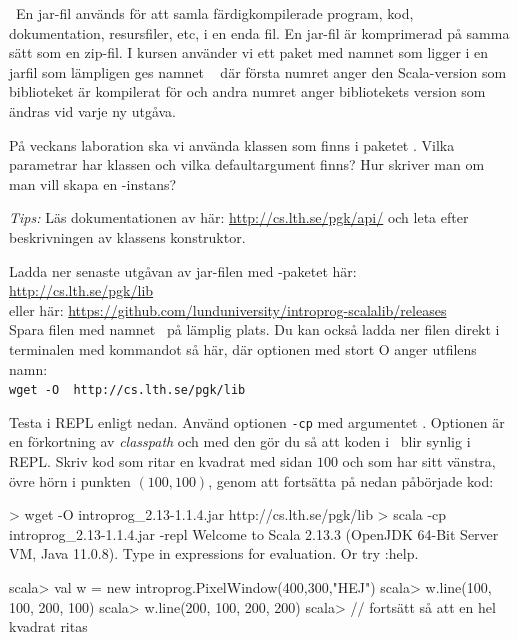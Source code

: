 \QUESTEND




\QUESTBEGIN

\Task \what~En jar-fil används för att samla färdigkompilerade program, kod, dokumentation, resursfiler, etc, i en enda fil. En jar-fil är komprimerad på samma sätt som en zip-fil. I kursen använder vi ett paket med namnet  som ligger i en jarfil som lämpligen ges namnet \LibJar~ där första numret anger den Scala-version som biblioteket är kompilerat för och andra numret anger bibliotekets version som ändras vid varje ny utgåva.

\Subtask På veckans laboration ska vi använda klassen  som finns i paketet . Vilka parametrar har klassen  och vilka defaultargument finns? Hur skriver man om man vill skapa en -instans?

\emph{Tips:}  Läs dokumentationen av  här: \url{http://cs.lth.se/pgk/api/}
och leta efter beskrivningen av klassens konstruktor.

\Subtask Ladda ner senaste utgåvan av jar-filen med -paketet här:
\\\url{http://cs.lth.se/pgk/lib}\\eller här: \url{https://github.com/lunduniversity/introprog-scalalib/releases}
\\ Spara filen med namnet  \LibJar~på lämplig plats. Du kan också ladda ner filen direkt i terminalen med kommandot  så här, där optionen  med stort O anger utfilens namn:\\
\texttt{wget -O \LibJar~http://cs.lth.se/pgk/lib}

\Subtask Testa  i REPL enligt nedan. Använd optionen \texttt{-cp} med argumentet \LibJar. Optionen  är en förkortning av \emph{classpath} och med den gör du så att koden i \LibJar~blir synlig i REPL.  Skriv kod som ritar en kvadrat med sidan $100$ och som har sitt vänstra, övre hörn i punkten $(100,100)$, genom att fortsätta på nedan påbörjade kod:

\begin{REPL}
> wget -O introprog_2.13-1.1.4.jar http://cs.lth.se/pgk/lib
> scala -cp introprog_2.13-1.1.4.jar -repl
Welcome to Scala 2.13.3 (OpenJDK 64-Bit Server VM, Java 11.0.8).
Type in expressions for evaluation. Or try :help.

scala> val w = new introprog.PixelWindow(400,300,"HEJ")
scala> w.line(100, 100, 200, 100)
scala> w.line(200, 100, 200, 200)
scala> // fortsätt så att en hel kvadrat ritas
\end{REPL}

